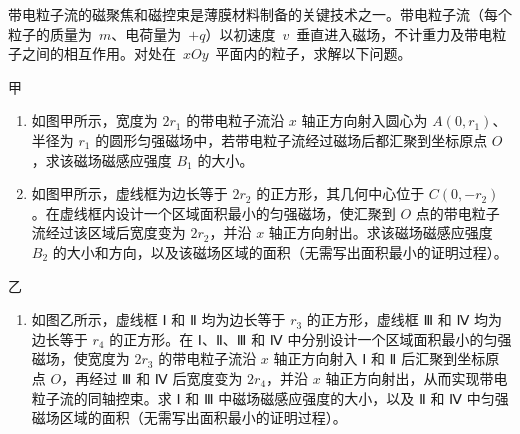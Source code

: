 \begin{question}
带电粒子流的磁聚焦和磁控束是薄膜材料制备的关键技术之一。带电粒子流（每个粒子的质量为~$m$、电荷量为~$+q$）以初速度~$v$~垂直进入磁场，不计重力及带电粒子之间的相互作用。对处在~$xOy$~平面内的粒子，求解以下问题。


甲

\begin{enumerate}[leftmargin=2em, label=(\arabic*)]
  \item 如图甲所示，宽度为 $2r_{1}$ 的带电粒子流沿 $x$ 轴正方向射入圆心为 $A(0,r_{1})$、半径为 $r_{1}$ 的圆形匀强磁场中，若带电粒子流经过磁场后都汇聚到坐标原点 $O$，求该磁场磁感应强度 $B_{1}$ 的大小。
  \item 如图甲所示，虚线框为边长等于 $2r_{2}$ 的正方形，其几何中心位于 $C(0,-r_{2})$。在虚线框内设计一个区域面积最小的匀强磁场，使汇聚到 $O$ 点的带电粒子流经过该区域后宽度变为 $2r_{2}$，并沿 $x$ 轴正方向射出。求该磁场磁感应强度 $B_{2}$ 的大小和方向，以及该磁场区域的面积（无需写出面积最小的证明过程）。
\end{enumerate}


乙

\begin{enumerate}[leftmargin=2em, label=(\arabic*), resume]
  \item 如图乙所示，虚线框 Ⅰ 和 Ⅱ 均为边长等于 $r_{3}$ 的正方形，虚线框 Ⅲ 和 Ⅳ 均为边长等于 $r_{4}$ 的正方形。在 Ⅰ、Ⅱ、Ⅲ 和 Ⅳ 中分别设计一个区域面积最小的匀强磁场，使宽度为 $2r_{3}$ 的带电粒子流沿 $x$ 轴正方向射入 Ⅰ 和 Ⅱ 后汇聚到坐标原点 $O$，再经过 Ⅲ 和 Ⅳ 后宽度变为 $2r_{4}$，并沿 $x$ 轴正方向射出，从而实现带电粒子流的同轴控束。求 Ⅰ 和 Ⅲ 中磁场磁感应强度的大小，以及 Ⅱ 和 Ⅳ 中匀强磁场区域的面积（无需写出面积最小的证明过程）。
\end{enumerate}
\end{question}

